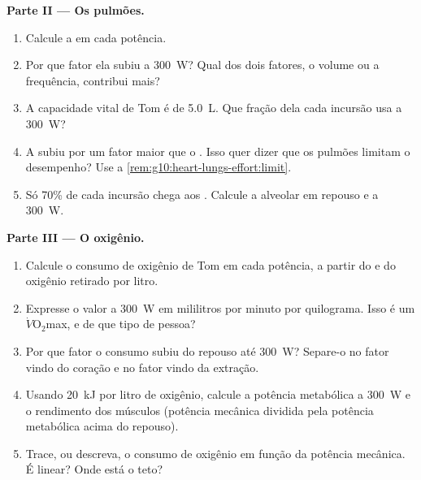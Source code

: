 \begin{problem}
\medskip
\noindent\textbf{Parte II --- Os pulmões.}
\begin{enumerate}[resume]
  \item Calcule a  em cada potência.
  \item Por que fator ela subiu a \qty{300}{W}? Qual dos dois fatores,
        o volume ou a frequência, contribui mais?
  \item A capacidade vital de Tom é de \qty{5.0}{L}. Que fração dela
        cada incursão usa a \qty{300}{W}?
  \item A  subiu por um fator maior que o .
        Isso quer dizer que os pulmões limitam o desempenho? Use a
        \cref{rem:g10:heart-lungs-effort:limit}.
  \item Só 70\% de cada incursão chega aos . Calcule a
         alveolar em repouso e a \qty{300}{W}.
\end{enumerate}

\medskip
\noindent\textbf{Parte III --- O oxigênio.}
\begin{enumerate}[resume]
  \item Calcule o consumo de oxigênio de Tom em cada potência, a
        partir do  e do oxigênio retirado por litro.
  \item Expresse o valor a \qty{300}{W} em mililitros por minuto por
        quilograma. Isso é um $\dot V\!\mathrm{O_2}$max, e de que tipo
        de pessoa?
  \item Por que fator o consumo subiu do repouso até \qty{300}{W}?
        Separe-o no fator vindo do coração e no fator vindo da
        extração.
  \item Usando \qty{20}{kJ} por litro de oxigênio, calcule a potência
        metabólica a \qty{300}{W} e o rendimento dos músculos
        (potência mecânica dividida pela potência metabólica acima do
        repouso).
  \item Trace, ou descreva, o consumo de oxigênio em função da
        potência mecânica. É linear? Onde está o teto?
\end{enumerate}


\end{problem}
